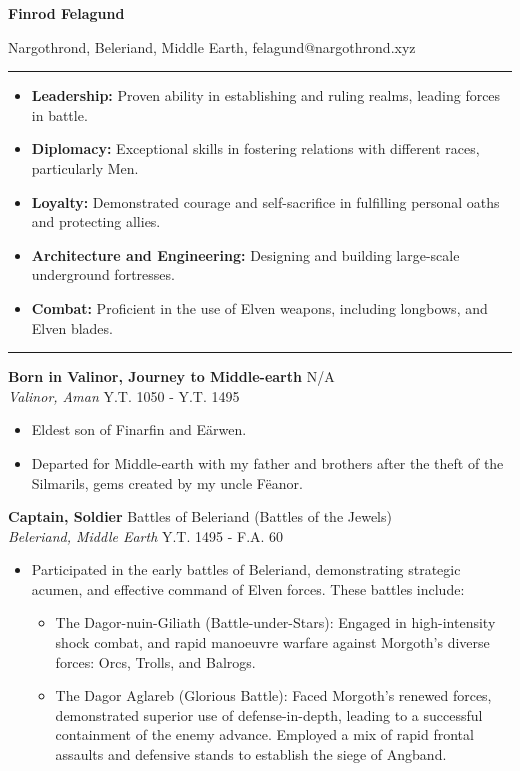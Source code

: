 \documentclass[a4paper, 10pt]{article}
\newcommand{\header}[1]{
    \begin{center}
        {\Large \textbf{#1}}
    \end{center}
}
\newcommand{\sectiontitle}[1]{
    \vspace{8pt}
    \footnotesize
    \noindent{\large \textbf{#1}}
    \vspace{3pt}
    \hrule
    \vspace{6pt}
}
\newcommand{\entry}[4]{
    \vspace{2pt}
    \footnotesize
    \noindent\textbf{#1} \hfill #2 \\
    \footnotesize
    \textit{#3} \hfill #4 \\
    \vspace{-9pt}
}
\begin{document}
\header{Finrod Felagund}

\noindent
\vspace{-21pt}
\small
\begin{center}
Nargothrond, Beleriand, Middle Earth, felagund@nargothrond.xyz
\end{center}

\sectiontitle{Skills}
\begin{itemize}[noitemsep]
    \footnotesize
    \item \textbf{Leadership:} Proven ability in establishing and ruling realms, leading forces in battle.
    \item \textbf{Diplomacy:} Exceptional skills in fostering relations with different races, particularly Men.
    \item \textbf{Loyalty:} Demonstrated courage and self-sacrifice in fulfilling personal oaths and protecting allies.
    \item \textbf{Architecture and Engineering:} Designing and building large-scale underground fortresses.
     \item \textbf{Combat:} Proficient in the use of Elven weapons, including longbows, and Elven blades.
\end{itemize}

\sectiontitle{Experience}

\entry{Born in Valinor, Journey to Middle-earth}{N/A}{Valinor, Aman}{Y.T. 1050 - Y.T. 1495}
\begin{itemize}[noitemsep, before=\small]
    \footnotesize
    \item Eldest son of Finarfin and Eärwen.
    \item Departed for Middle-earth with my father and brothers after the theft of the Silmarils, gems created by my uncle Fëanor.
\end{itemize}
\entry{Captain, Soldier}{Battles of Beleriand (Battles of the Jewels)}{Beleriand, Middle Earth}{Y.T. 1495 - F.A. 60}
\begin{itemize}[noitemsep, before=\small]
    \footnotesize
    \item Participated in the early battles of Beleriand, demonstrating strategic acumen, and effective command of Elven forces. These battles include:
        \begin{itemize}
            \item The Dagor-nuin-Giliath (Battle-under-Stars): Engaged in high-intensity shock combat, and rapid manoeuvre warfare against Morgoth's diverse forces: Orcs, Trolls, and Balrogs.
            \item The Dagor Aglareb (Glorious Battle): Faced Morgoth's renewed forces, demonstrated superior use of defense-in-depth, leading to a successful containment of the enemy advance. Employed a mix of rapid frontal assaults and defensive stands to establish the siege of Angband.
        \end{itemize}
\end{itemize}
\end{document}
